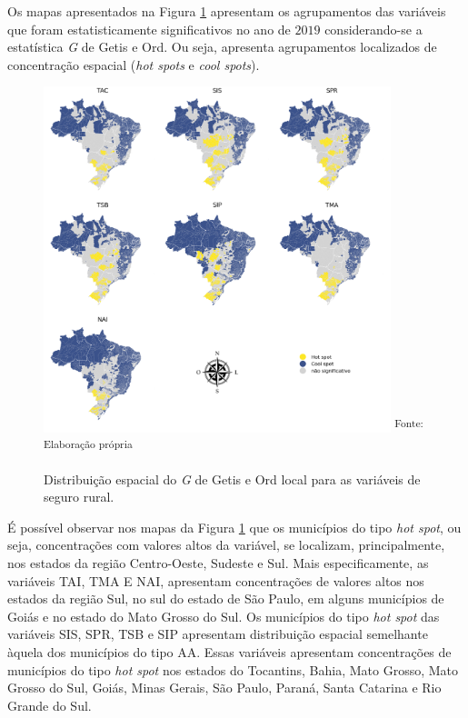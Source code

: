 \documentclass[
	12pt,				%
	openright,			%
	oneside,			%
	a4paper,			%
	chapter=TITLE,		%
	section=TITLE,		%
	english,			%
	french,				%
	spanish,			%
	brazil				%
	]{abntex2}
\begin{document}
Os mapas apresentados na Figura \ref{g_variaveis} apresentam os agrupamentos das variáveis que foram estatisticamente significativos no ano de $2019$ considerando-se a estatística \textit{G} de Getis e Ord. Ou seja, apresenta agrupamentos localizados de concentração espacial (\textit{hot spots} e \textit{cool spots}).

\begin{figure}[h]
	\centering
	\caption{Distribuição espacial do \textit{G} de Getis e Ord local para as variáveis de seguro rural.}
	\includegraphics[width=0.9\textwidth]{img/map_getis_ord_variaveis.png}
	\noindent \small \textsuperscript{Fonte: Elaboração própria}
	\label{g_variaveis}
\end{figure}

É possível observar nos mapas da Figura \ref{g_variaveis} que os municípios do tipo \textit{hot spot}, ou seja, concentrações com valores altos da variável, se localizam, principalmente, nos estados da região Centro-Oeste, Sudeste e Sul. Mais especificamente, as variáveis TAI, TMA E NAI, apresentam concentrações de valores altos nos estados da região Sul, no sul do estado de São Paulo, em alguns municípios de Goiás e no estado do Mato Grosso do Sul. Os municípios do tipo \textit{hot spot} das variáveis SIS, SPR, TSB e SIP apresentam distribuição espacial semelhante àquela dos municípios do tipo AA. Essas variáveis apresentam concentrações de municípios do tipo \textit{hot spot} nos estados do Tocantins, Bahia, Mato Grosso, Mato Grosso do Sul, Goiás, Minas Gerais, São Paulo, Paraná, Santa Catarina e Rio Grande do Sul. 
\end{document}
